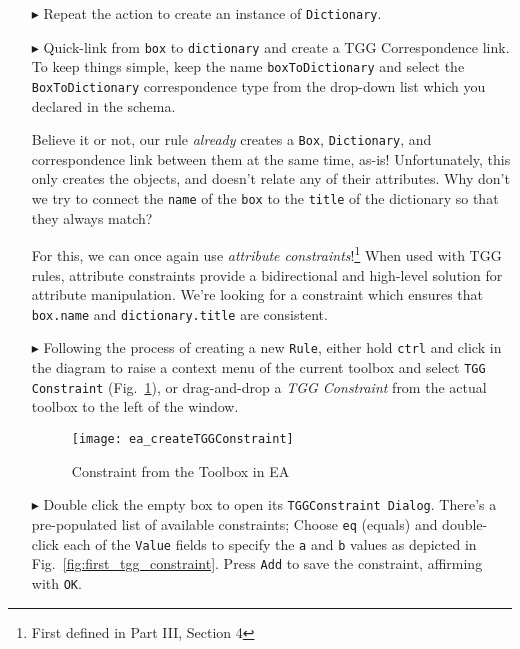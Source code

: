 \begin{enumerate}
\item[$\blacktriangleright$] Repeat the action to create an instance of \texttt{Dictionary}.

\newpage

\item[$\blacktriangleright$] Quick-link from \texttt{box} to \texttt{dictionary} and create a TGG Correspondence link. To keep things simple, keep the name 
\texttt{boxToDictionary} and select the \texttt{BoxToDictionary} correspondence type from the drop-down list which you declared in the schema.

Believe it or not, our rule \emph{already} creates a \texttt{Box}, \texttt{Dictionary}, and correspondence link between them at the same time, as-is!
Unfortunately, this only creates the objects, and doesn't relate any of their attributes. Why don't we try to connect the \texttt{name} of the \texttt{box} to
the \texttt{title} of the dictionary so that they always match? 

For this, we can once again use \emph{attribute constraints}!\footnote{First defined in Part III, Section 4} When used with TGG rules, attribute constraints
provide a bidirectional and high-level solution for attribute manipulation. We're looking for a constraint which ensures that \texttt{box.name} and
\texttt{dictionary.title} are consistent.

\vspace{0.5cm}

\item[$\blacktriangleright$] Following the process of creating a new \texttt{Rule}, either hold \texttt{ctrl} and click in the diagram to raise a context menu
of the current toolbox and select \texttt{TGG Constraint} (Fig.~\ref{fig:common_toolbox}), or drag-and-drop a \emph{TGG Constraint} from the actual toolbox to
the left of the window.

\vspace{0.5cm}

\begin{figure}[htbp]
\begin{center}
  \texttt{[image: ea\_createTGGConstraint]}
  \caption{Constraint from the Toolbox in EA}
  \label{fig:common_toolbox}
\end{center}
\end{figure}

\item[$\blacktriangleright$] Double click the empty box to open its \texttt{TGGConstraint Dialog}. There's a pre-populated list of available constraints; Choose
\texttt{eq} (equals) and double-click each of the \texttt{Value} fields to specify the \texttt{a} and \texttt{b} values as depicted in
Fig.~\ref{fig:first_tgg_constraint}. Press \texttt{Add} to save the constraint, affirming with \texttt{OK}.


\end{enumerate}
